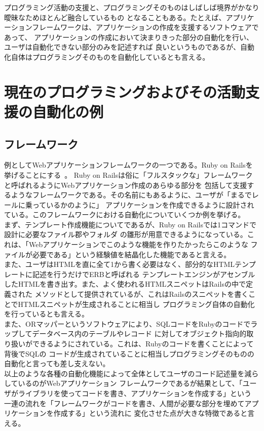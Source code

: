 \documentclass[10pt,a4paper]{ltjsarticle}       %
\begin{document}
プログラミング活動の支援と、プログラミングそのものはしばしば境界がかなり曖昧なためほとんど融合しているもの
となることもある。たとえば、アプリケーションフレームワークは、アプリケーションの作成を支援するソフトウェアであって、
アプリケーションの作成において決まりきった部分の自動化を行い、ユーザは自動化できない部分のみを記述すれば
良いというものであるが、自動化自体はプログラミングそのものを自動化しているとも言える。\\
\section{現在のプログラミングおよびその活動支援の自動化の例}
\subsection{フレームワーク}
例としてWebアプリケーションフレームワークの一つである。Ruby on Railsを挙げることにする~\cite{RubyOnRails}。
Ruby on Railsは俗に「フルスタックな」フレームワークと呼ばれるようにWebアプリケーション作成のあらゆる部分を
包括して支援するようなフレームワークである。その名前にもあるように、ユーザが「まるでレールに乗っているかのように」
アプリケーションを作成できるように設計されている。このフレームワークにおける自動化についていくつか例を挙げる。\\

まず、テンプレート作成機能についてであるが、Ruby on Railsでは1コマンドで設計に必要なファイル郡やフォルダ
の雛形が用意できるようになっている。これは、「Webアプリケーションでこのような機能を作りたかったらこのような
ファイルが必要である」という経験値を結晶化した機能であると言える。\\
また、ユーザはHTMLを直に全て1から書く必要はなく、部分的なHTMLテンプレートに記述を行うだけでERBと呼ばれる
テンプレートエンジンがアセンブルしたHTMLを書き出す。また、よく使われるHTMLスニペットはRailsの中で定義された
メソッドとして提供されているが、これはRailsのスニペットを書くことでHTMLスニペットが生成されることに相当し
プログラミング自体の自動化を行っているとも言える。\\
また、ORマッパーというソフトウェアにより、SQLコードをRubyのコードでラップしてデータベース内のテーブルやレコード
に対してオブジェクト指向的取り扱いができるようにされている。これは、Rubyのコードを書くことによって背後でSQLの
コードが生成されていることに相当しプログラミングそのものの自動化と言っても差し支えない。\\

以上のような各種の自動化機能によって全体としてユーザのコード記述量を減らしているのがWebアプリケーション
フレームワークであるが結果として、「ユーザがライブラリを使ってコードを書き、アプリケーションを作成する」という
一連の流れを「フレームワークがコードを書き、人間が必要な部分を埋めてアプリケーションを作成する」という流れに
変化させた点が大きな特徴であると言える。
\end{document}
